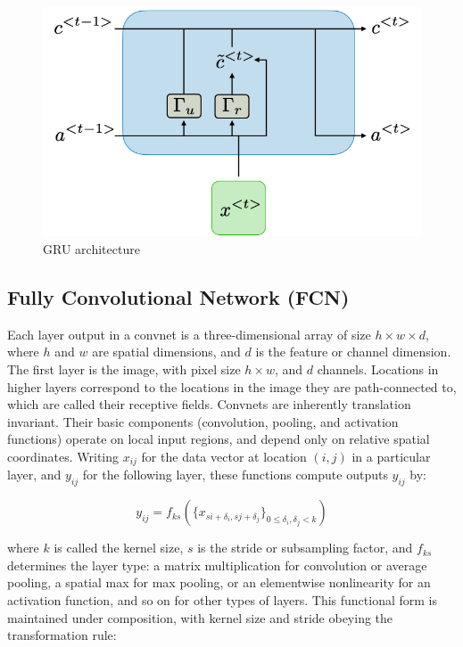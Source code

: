 \documentclass{ieeeojies}
\begin{document}
\begin{figure}[H]
    \centering
\begin{minipage}{0.4\textwidth}
        \centering
        \includegraphics[width=\textwidth]{bibliography/Figure/gru-ltr.png}
        \caption{GRU architecture}
        \label{fig:3}
\end{minipage}
\end{figure}

\subsection{Fully Convolutional Network (FCN)}
Each layer output in a convnet is a three-dimensional array
of size $h \times w \times d$, where $h$ and $w$ are spatial dimensions, and
$d$ is the feature or channel dimension. The first layer is the
image, with pixel size $h \times w$, and $d$ channels. Locations in
higher layers correspond to the locations in the image they
are path-connected to, which are called their receptive fields.
Convnets are inherently translation invariant. Their basic components (convolution, pooling, and activation functions) operate on local input regions, and depend only on
relative spatial coordinates. Writing $x_{ij}$ for the data vector at
location $(i, j)$ in a particular layer, and $y_{ij}$ for the following
layer, these functions compute outputs $y_{ij}$ by:

\[
y_{ij} = f_{ks} \left( \{x_{si+\delta_i, sj+\delta_j}\}_{0 \le \delta_i, \delta_j < k} \right)
\]

where $k$ is called the kernel size, $s$ is the stride or subsampling factor, and $f_{ks}$ determines the layer type: a matrix
multiplication for convolution or average pooling, a spatial
max for max pooling, or an elementwise nonlinearity for an
activation function, and so on for other types of layers.
This functional form is maintained under composition,
with kernel size and stride obeying the transformation rule:
\end{document}
